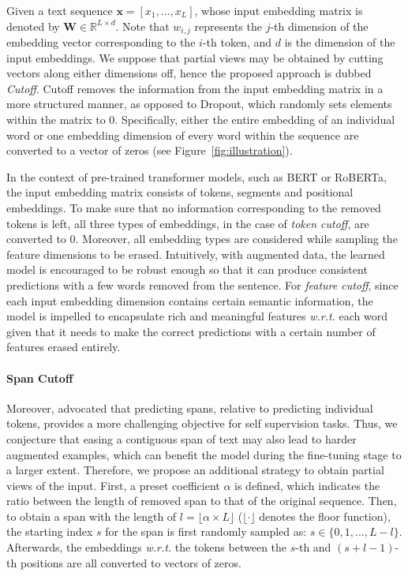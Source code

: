 \documentclass[11pt,a4paper]{article}
\begin{document}
Given a text sequence $\mathbf{x} = [x_1, ..., x_L]$, whose input embedding matrix is denoted by $\mathbf{W} \in \mathbb{R}^{L \times d}$. Note that $w_{i, j}$ represents the $j$-th dimension of the embedding vector corresponding to the $i$-th token, and $d$ is the dimension of the input embeddings. 
We suppose that partial views may be obtained by cutting vectors along either dimensions off, hence the proposed approach is dubbed \emph{Cutoff}. 
Cutoff removes the information from the input embedding matrix in a more structured manner, as opposed to Dropout, which randomly sets elements within the matrix to $0$.
Specifically, either the entire embedding of an individual word or one embedding dimension of every word within the sequence are converted to a vector of zeros (see Figure~\ref{fig:illustration}). 

In the context of pre-trained transformer models, such as BERT or RoBERTa, the input embedding matrix consists of tokens, segments and positional embeddings. To make sure that no information corresponding to the removed tokens is left, all three types of embeddings, in the case of \emph{token cutoff}, are converted to $0$. Moreover, all embedding types are considered while sampling the feature dimensions to be erased.  
Intuitively, with augmented data, the learned model is encouraged to be robust enough so that it can produce consistent predictions with a few words removed from the sentence. 
For \emph{feature cutoff}, since each input embedding dimension contains certain semantic information, the model is impelled to encapsulate rich and meaningful features \emph{w.r.t.} each word given that it needs to make the correct predictions with a certain number of features erased entirely.
\vspace{-2mm}
\paragraph{Span Cutoff} Moreover, \cite{joshi2019spanbert} advocated that predicting spans, relative to predicting individual tokens, provides a more challenging objective for self supervision tasks. Thus, we conjecture that easing a contiguous span of text may also lead to harder augmented examples, which can benefit the model during the fine-tuning stage to a larger extent. Therefore, we propose an additional strategy to obtain partial views of the input. First, a preset coefficient $\alpha$ is defined, which indicates the ratio between the length of removed span to that of the original sequence.
Then, to obtain a span with the length of $l = \lfloor \alpha \times L \rfloor$ ($\lfloor \cdot \rfloor$ denotes the floor function), the starting index $s$ for the span is first randomly sampled as: $s \in \{ 0, 1, ..., L - l\}$. Afterwards, the embeddings \emph{w.r.t.} the tokens between the $s$-th and $(s+l-1)$-th positions are all converted to vectors of zeros.
\end{document}
